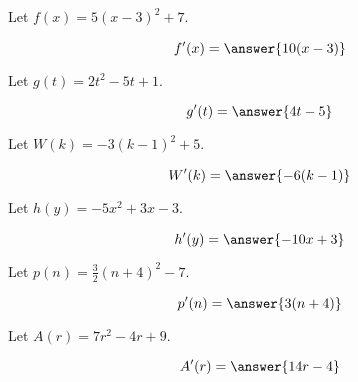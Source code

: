 \documentclass{ximera}
\author{Lee Wayand}
\begin{document}
\begin{exercise} 






\begin{question}


Let $f(x) = 5 (x-3)^2 + 7$.


\[
f'(x) = \answer{10(x-3)}
\]

\end{question}





\begin{question}


Let $g(t) = 2t^2 - 5t + 1$.


\[
g'(t) = \answer{4t-5}
\]

\end{question}











\begin{question}


Let $W(k) = -3 (k-1)^2 + 5$.


\[
W'(k) = \answer{-6(k-1)}
\]

\end{question}





\begin{question}


Let $h(y) = -5x^2 + 3x - 3$.


\[
h'(y) = \answer{-10x + 3}
\]

\end{question}












\begin{question}


Let $p(n) = \frac{3}{2} (n+4)^2 - 7$.


\[
p'(n) = \answer{3(n+4)}
\]

\end{question}





\begin{question}


Let $A(r) = 7r^2 - 4r + 9$.


\[
A'(r) = \answer{14r-4}
\]

\end{question}










\end{exercise}
\end{document}
